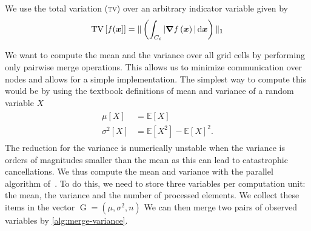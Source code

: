 We use the total variation (\textsc{tv}) over an arbitrary indicator variable given by
\begin{equation}
  \label{eq:tv}
  \operatorname{TV}\left[ f(\bm{x}] \right] =
\Vert \left(\intdcell{ \vert \gradient{f \left( \bm{x} \right)} \vert } \right) \Vert_1
\end{equation}

\newcommand{\gobs}{\operatorname{G}}
\newcommand{\mean}{\mu}
\newcommand{\std}{\sigma}
\newcommand{\variance}{\std^2}
\newcommand{\gobsCount}{n}
We want to compute the mean and the variance over all grid cells by performing only pairwise merge operations.
This allows us to minimize communication over nodes and allows for a simple implementation.
The simplest way to compute this would be by using the textbook definitions of mean and variance of a random variable $X$
\newcommand{\expectation}{\mathbb{E}}
\begin{align}
  \begin{split}
    \mu [X] &= \expectation \left[ X \right]\\
    \variance [X] &= \expectation \left[ X^2 \right] - \expectation \left[ X \right]^2.
  \end{split}
\end{align}
The reduction for the variance is numerically unstable when the variance is orders of magnitudes smaller than the mean as this can lead to catastrophic cancellations.
We thus compute the mean and variance with the parallel algorithm of~\cite{chan1982updating}.
To do this, we need to store three variables per computation unit:
the mean, the variance and the number of processed elements.
We collect these items in the vector $\gobs = (\mean, \variance, \gobsCount)$
We can then merge two pairs of observed variables by \cref{alg:merge-variance}.

